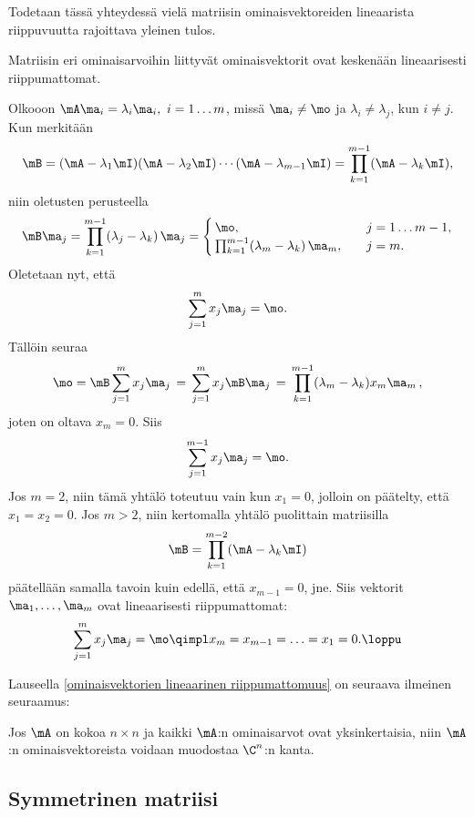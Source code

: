 Todetaan tässä yhteydessä vielä matriisin ominaisvektoreiden lineaarista riippuvuutta
rajoittava yleinen tulos.
\begin{Lause} \label{ominaisvektorien lineaarinen riippumattomuus}
 Matriisin eri ominaisarvoihin liittyvät ominaisvektorit
ovat keskenään lineaarisesti riippumattomat.
\end{Lause}
\tod Olkooon $\mA\ma_i=\lambda_i\ma_i,\ i=1 \ldots m$, missä $\ma_i\neq\mo$ ja 
$\lambda_i\neq\lambda_j$, kun $i \neq j$. Kun merkitään
\[
\mB=(\mA-\lambda_1\mI)(\mA-\lambda_2\mI) \cdots (\mA-\lambda_{m-1}\mI) 
   = \prod_{k=1}^{m-1}(\mA-\lambda_k\mI),
\]
niin oletusten perusteella
\[
\mB\ma_j = \prod_{k=1}^{m-1}(\lambda_j-\lambda_k)\,\ma_j 
         = \begin{cases} 
            \,\mo, \quad &j=1 \ldots m-1, \\ 
            \,\prod_{k=1}^{m-1}(\lambda_m-\lambda_k)\,\ma_m, \quad &j=m. 
           \end{cases} 
\]
Oletetaan nyt, että
\[
\sum_{j=1}^m x_j\ma_j = \mo.
\]
Tällöin seuraa
\[
\mo=\mB\sum_{j=1}^m x_j\ma_j\,=\,\sum_{j=1}^m x_j\mB\ma_j\,
                              =\,\prod_{k=1}^{m-1}(\lambda_m-\lambda_k)x_m\ma_m\,,
\]
joten on oltava $x_m=0$. Siis
\[
\sum_{j=1}^{m-1} x_j\ma_j = \mo.
\]
Jos $m=2$, niin tämä yhtälö toteutuu vain kun $x_1=0$, jolloin on päätelty, että $x_1=x_2=0$.
Jos $m>2$, niin kertomalla yhtälö puolittain matriisilla
\[
\mB=\prod_{k=1}^{m-2}(\mA-\lambda_k\mI)
\]
päätellään samalla tavoin kuin edellä, että $x_{m-1}=0$, jne. Siis vektorit 
$\ma_1, \ldots, \ma_m$ ovat lineaarisesti riippumattomat:
\[
\sum_{j=1}^m x_j\ma_j = \mo \qimpl x_m = x_{m-1} = \ldots = x_1 = 0. \loppu
\]

Lauseella \ref{ominaisvektorien lineaarinen riippumattomuus} on seuraava ilmeinen seuraamus:
\begin{Kor} Jos $\mA$ on kokoa $n\times n$ ja kaikki $\mA$:n ominaisarvot ovat yksinkertaisia,
niin $\mA$:n ominaisvektoreista voidaan muodostaa $\C^n$:n kanta.
\end{Kor}

\subsection*{Symmetrinen matriisi}

